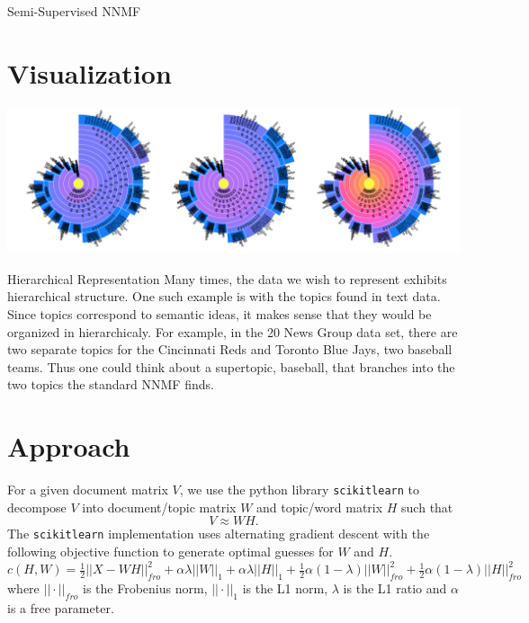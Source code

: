 \documentclass[12pt]{pom_thesis}
\begin{document}
\begin{chapter}{Semi-Supervised NNMF}
	\section{Visualization}
\begin{center}
	\includegraphics[width=7	in]{semi-viz}
\end{center}
\end{chapter}
\begin{chapter}{Hierarchical Representation}
Many times, the data we wish to represent exhibits hierarchical structure. One such example is with the topics found in text data. Since topics correspond to semantic ideas, it makes sense that they would be organized in hierarchicaly. For example, in the 20 News Group data set, there are two separate topics for the Cincinnati Reds and Toronto Blue Jays, two baseball teams. Thus one could think about a supertopic, baseball, that branches into the two topics the standard NNMF finds.
\section{Approach}
For a given document matrix $V$, we use the python library \texttt{scikitlearn} to decompose $V$ into document/topic matrix $W$ and topic/word matrix $H$ such that $$V \approx WH.$$ The  \texttt{scikitlearn} implementation uses alternating gradient descent with the following objective function to generate optimal guesses for $W$ and $H$.
$$c(H,W) = \tfrac{1}{2} ||X-WH||_{fro}^2 + \alpha \lambda ||W||_1 + \alpha \lambda ||H||_1 + \tfrac{1}{2} \alpha (1-\lambda) ||W||^2_{fro} + \tfrac{1}{2} \alpha (1-\lambda) ||H||^2_{fro}  $$
where $||\cdot||_{fro}$ is the Frobenius norm, $||\cdot||_{1}$ is the L1 norm, $\lambda$ is the L1 ratio and $\alpha$ is a free parameter. 


\end{chapter}
\end{document}
